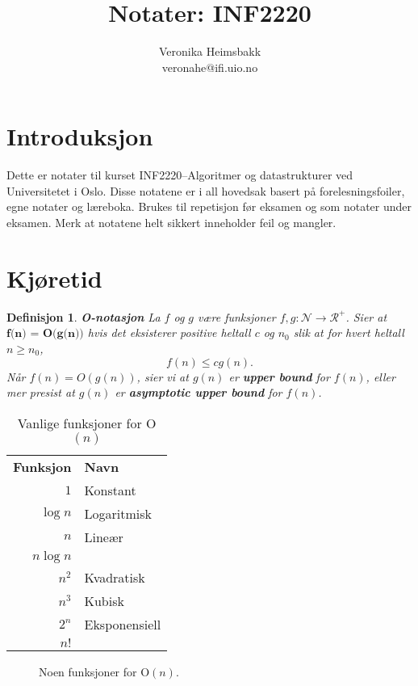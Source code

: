 \documentclass[11pt,a4paper]{article}
\title{Notater: INF2220}
\author{Veronika Heimsbakk \\ 
veronahe@ifi.uio.no}
\theoremstyle{def}
\newtheorem{definition}[subsection]{Definisjon}
\begin{document}
\maketitle{}
\tableofcontents

\section*{Introduksjon}
Dette er notater til kurset INF2220--Algoritmer og datastrukturer\cite{inf2220} ved Universitetet i Oslo. Disse notatene er i all hovedsak basert på forelesningsfoiler, egne notater og læreboka. Brukes til repetisjon før eksamen og som notater under eksamen. Merk at notatene helt sikkert inneholder feil og mangler.

\newpage

\section{Kjøretid}

\begin{definition}
\emph{\textbf{O-notasjon}}
La $f$ og $g$ være funksjoner $f,g: \mathcal{N} \rightarrow \mathcal{R}^+$. Sier at $\textbf{f(n) = O(g(n))}$ hvis det eksisterer positive heltall $c$ og $n_0$ slik at for hvert heltall $n \geq n_0$,
$$f(n) \leq c g(n).$$
Når $f(n) = O(g(n))$, sier vi at $g(n)$ er \textbf{upper bound} for $f(n)$, eller mer presist at $g(n)$ er \textbf{asymptotic upper bound} for $f(n)$.
\end{definition}

\begin{table}[h!]
\centering
\begin{tabular}{rl}
\textbf{Funksjon}&\textbf{Navn}\\
$1$&Konstant\\
$\log n$&Logaritmisk\\
$n$&Lineær\\
$n \log n$&\\
$n^2$&Kvadratisk\\
$n^3$&Kubisk\\
$2^n$&Eksponensiell\\
$n!$&\\
\end{tabular}
\label{tab:ofunc}
\caption{Vanlige funksjoner for O$(n)$}
\end{table}

\begin{figure}[h!]
\centering
{}
\label{fig:ofunc}
\caption{Noen funksjoner for O$(n)$.}
\end{figure}
\end{document}

